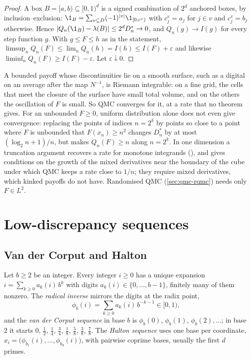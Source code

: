 \begin{proof}
A box $B=[a,b)\subseteq[0,1)^d$ is a signed combination of $2^d$ anchored boxes, by
inclusion--exclusion: $\1_B=\sum_{v\subseteq D}(-1)^{|v|}\1_{[0,c^v)}$ with $c^v_j=a_j$ for
$j\in v$ and $c^v_j=b_j$ otherwise. Hence $|Q_n(\1_B)-\lambda(B)|\le2^dD^*_n\to0$, and
$Q_n(g)\to I(g)$ for every step function $g$. With $g\le F\le h$ as in the statement,
$\limsup_nQ_n(F)\le\lim_nQ_n(h)=I(h)\le I(F)+\varepsilon$ and likewise
$\liminf_nQ_n(F)\ge I(F)-\varepsilon$. Let $\varepsilon\downarrow0$.
\end{proof}

A bounded payoff whose discontinuities lie on a smooth surface, such as a digital on an
average after the map $N^{-1}$, is Riemann integrable: on a fine grid, the cells that meet the
closure of the surface have small total volume, and on the others the oscillation of $F$ is
small. So QMC converges for it, at a rate that no theorem gives.
For an unbounded $F\ge0$, uniform distribution alone does not even give convergence: replacing
the points of indices $n=2^k$ by points so close to a point where $F$ is unbounded that
$F(x_n)\ge n^2$ changes $D^*_n$ by
at most $(\log_2n+1)/n$, but makes $Q_n(F)\ge n$ along $n=2^k$. In one dimension a truncation argument
recovers a rate for monotone integrands (), and
\textcite{owen-2006} gives conditions on the growth of the mixed derivatives near the boundary
of the cube under which QMC keeps a rate close to $1/n$; they require mixed derivatives,
which kinked payoffs do not have. Randomised QMC (\cref{sec:qmc-rqmc}) needs only
$F\in L^2$.

\section{Low-discrepancy sequences}\label{sec:qmc-sequences}

\subsection{Van der Corput and Halton}

Let $b\ge2$ be an integer. Every integer $i\ge0$ has a unique expansion
$i=\sum_{k\ge0}a_k(i)\,b^k$ with digits $a_k(i)\in\{0,\dots,b-1\}$, finitely many of them
nonzero. The \emph{radical inverse} mirrors the digits at the radix point,
\[
  \phi_b(i)=\sum_{k\ge0}a_k(i)\,b^{-k-1}\in[0,1),
\]
and the \emph{van der Corput sequence} in base $b$ is $\phi_b(0)$, $\phi_b(1)$,
$\phi_b(2),\dots$; in base $2$ it starts $0$, $\frac12$, $\frac14$, $\frac34$, $\frac18$,
$\frac58$, $\frac38$, $\frac78$. The
\emph{Halton sequence} \citep{halton-1960} uses one base per coordinate,
$x_i=\big(\phi_{b_1}(i),\dots,\phi_{b_d}(i)\big)$, with pairwise coprime bases, usually the
first $d$ primes.

